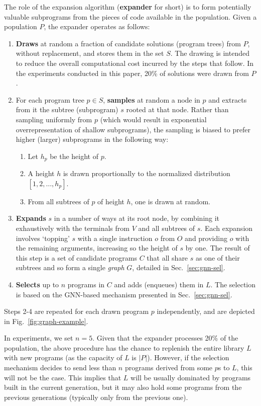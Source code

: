 The role of the expansion algorithm (\textbf{expander} for short) is to form potentially valuable subprograms from the pieces of code available in the population. Given a population $P$, the expander operates as follows:
\begin{enumerate}
    \item \textbf{Draws} at random a fraction of candidate solutions (program trees) from $P$, without replacement, and stores them in the set $S$. The drawing is intended to reduce the overall computational cost incurred by the steps that follow. In the experiments conducted in this paper, 20\% of solutions were drawn from $P$. 
    \item For each program tree $p \in S$, \textbf{samples} at random a node in $p$ and extracts from it the subtree (subprogram) $s$ rooted at that node. Rather than sampling uniformly from $p$ (which would result in exponential overrepresentation of shallow subprograms), the sampling is biased to prefer higher (larger) subprograms in the following way: 
    \begin{enumerate}
        \item Let $h_p$ be the height of $p$.  
        \item A height $h$ is drawn proportionally to the normalized distribution $[1, 2, \ldots, h_p]$.  
        \item From all subtrees of $p$ of height $h$, one is drawn at random. 
    \end{enumerate}
    \item \textbf{Expands} $s$ in a number of ways at its root node, by combining it exhaustively with the terminals from $V$ and all subtrees of $s$. Each expansion involves `topping' $s$ with a single instruction $o$ from $O$ and providing $o$ with the remaining arguments, increasing so the height of $s$ by one. The result of this step is a set of candidate programs $C$ that all share $s$ as one of their subtrees and so form a single \emph{graph} $G$, detailed in Sec.\ \ref{sec:gnn-sel}. 
    \item \textbf{Selects} up to $n$ programs in $C$ and adds (enqueues) them in $L$. The selection is based on the GNN-based mechanism presented in Sec.\ \ref{sec:gnn-sel}.  
\end{enumerate}
Steps 2-4 are repeated for each drawn program $p$ independently, and are depicted in Fig.\ \ref{fig:graph-example}.

In experiments, we set $n=5$. Given that the expander processes 20\% of the population, the above procedure has the chance to replenish the entire library $L$ with new programs (as the capacity of $L$ is $|P|$). However, if the selection mechanism decides to send less than $n$ programs derived from some $p$s to $L$, this will not be the case. This implies that $L$ will be usually dominated by programs built in the current generation, but it may also hold some programs from the previous generations (typically only from the previous one).   

